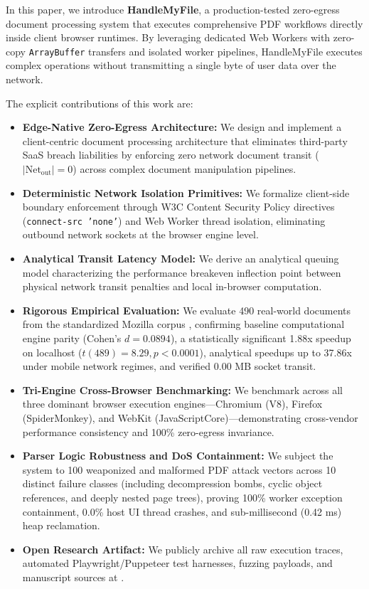 \documentclass[journal]{IEEEtran}
\begin{document}
In this paper, we introduce \textbf{HandleMyFile}, a production-tested zero-egress document processing system that executes comprehensive PDF workflows directly inside client browser runtimes. By leveraging dedicated Web Workers with zero-copy \texttt{ArrayBuffer} transfers and isolated worker pipelines, HandleMyFile executes complex operations without transmitting a single byte of user data over the network.

The explicit contributions of this work are:
\begin{itemize}[leftmargin=12pt, topsep=2pt, itemsep=2pt]
\item \textbf{Edge-Native Zero-Egress Architecture:} We design and implement a client-centric document processing architecture that eliminates third-party SaaS breach liabilities by enforcing zero network document transit ($|\text{Net}_{\text{out}}| = 0$) across complex document manipulation pipelines.
\item \textbf{Deterministic Network Isolation Primitives:} We formalize client-side boundary enforcement through W3C Content Security Policy directives (\texttt{connect-src 'none'}) and Web Worker thread isolation, eliminating outbound network sockets at the browser engine level.
\item \textbf{Analytical Transit Latency Model:} We derive an analytical queuing model characterizing the performance breakeven inflection point between physical network transit penalties and local in-browser computation.
\item \textbf{Rigorous Empirical Evaluation:} We evaluate 490 real-world documents from the standardized Mozilla corpus \cite{mozilla2024corpus}, confirming baseline computational engine parity (Cohen's $d = 0.0894$), a statistically significant 1.88x speedup on localhost ($t(489) = 8.29, p < 0.0001$), analytical speedups up to 37.86x under mobile network regimes, and verified 0.00 MB socket transit.
\item \textbf{Tri-Engine Cross-Browser Benchmarking:} We benchmark across all three dominant browser execution engines---Chromium (V8), Firefox (SpiderMonkey), and WebKit (JavaScriptCore)---demonstrating cross-vendor performance consistency and 100\% zero-egress invariance.
\item \textbf{Parser Logic Robustness and DoS Containment:} We subject the system to 100 weaponized and malformed PDF attack vectors across 10 distinct failure classes (including decompression bombs, cyclic object references, and deeply nested page trees), proving 100\% worker exception containment, 0.0\% host UI thread crashes, and sub-millisecond (0.42 ms) heap reclamation.
\item \textbf{Open Research Artifact:} We publicly archive all raw execution traces, automated Playwright/Puppeteer test harnesses, fuzzing payloads, and manuscript sources at \cite{fadhlillah2026artifact}.
\end{itemize}
\end{document}
